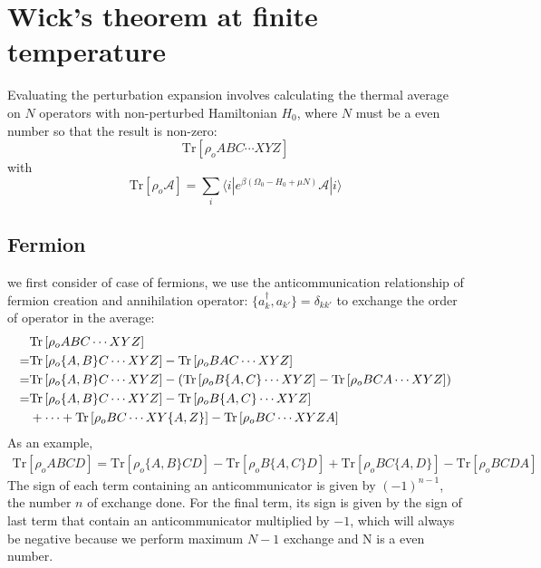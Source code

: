\documentclass{article}
\begin{document}
\section{Wick's theorem at finite temperature}
Evaluating the perturbation expansion involves calculating the thermal average on $N$ operators with  
non-perturbed Hamiltonian $H_0$, where
$N$ must be a even number so that the result is non-zero:
\begin{equation}
    \text{Tr}\left[ \rho_o ABC \cdots XYZ  \right]
\end{equation}
with 
\begin{equation}
    \text{Tr}\left[ \rho_o \mathcal{A} \right] = \sum_i \langle i | e^{\beta(\Omega_0 - H_0 + \mu N)} \mathcal{A} |i \rangle
\end{equation}

\subsection*{Fermion}
we first consider of case of fermions, we use the anticommunication relationship
of fermion creation and annihilation operator: $\{ a_k^{\dagger} , a_{k'} \} = \delta_{kk'}$ to 
exchange the order of operator in the average:
\begin{align}
    &\text{Tr}\left[ \rho_o ABC \cdots XYZ  \right] \notag \\
    = &\text{Tr}\left[ \rho_o \{A,B\} C \cdots XYZ  \right] - \text{Tr}\left[ \rho_o BAC \cdots XYZ  \right] \notag \\
    = &\text{Tr}\left[ \rho_o \{A,B\} C \cdots XYZ  \right] - \left( \text{Tr}\left[ \rho_o B\{A,C\} \cdots XYZ  \right] - \text{Tr}\left[ \rho_o BCA \cdots XYZ  \right] \right) \notag \\
    = &\text{Tr}\left[ \rho_o \{A,B\} C \cdots XYZ  \right] - \text{Tr}\left[ \rho_o B\{A,C\} \cdots XYZ  \right] \notag \\
    & + \cdots + \text{Tr}\left[ \rho_o BC \cdots XY\{A,Z\}  \right] - \text{Tr}\left[ \rho_o BC \cdots XYZA  \right] \label{contraction1}
\end{align}
As an example, 
\begin{align}
    \text{Tr}\left[ \rho_o ABCD  \right] = \text{Tr}\left[ \rho_o\{A,B\} CD \right] - \text{Tr}\left[ \rho_o B\{A,C\} D \right] + \text{Tr}\left[ \rho_o BC\{A,D\} \right] - \text{Tr}\left[ \rho_o BCDA \right]
\end{align}
The sign of each term containing an anticommunicator is given by $(-1)^{n-1}$, the number $n$ of exchange done. For the final term, its sign
is given by the sign of last term that contain an anticommunicator multiplied by $-1$, which will always be negative because we perform maximum
$N-1$ exchange and N is a even number. 
\end{document}
